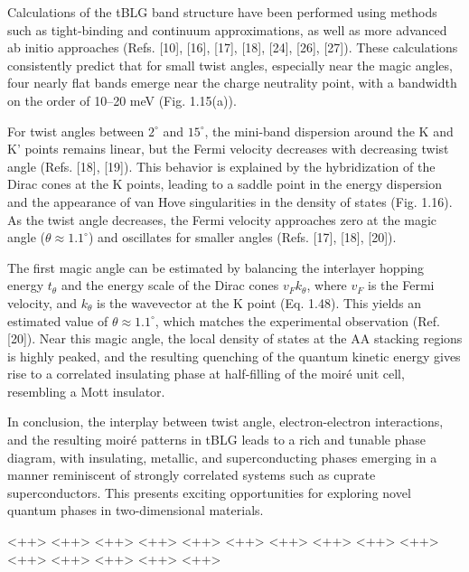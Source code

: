 Calculations of the tBLG band structure have been performed using methods such as tight-binding and continuum approximations, as well as more advanced ab initio approaches (Refs. [10], [16], [17], [18], [24], [26], [27]). These calculations consistently predict that for small twist angles, especially near the magic angles, four nearly flat bands emerge near the charge neutrality point, with a bandwidth on the order of 10–20 meV (Fig. 1.15(a)).

For twist angles between \(2^\circ\) and \(15^\circ\), the mini-band dispersion around the K and K' points remains linear, but the Fermi velocity decreases with decreasing twist angle (Refs. [18], [19]). This behavior is explained by the hybridization of the Dirac cones at the K points, leading to a saddle point in the energy dispersion and the appearance of van Hove singularities in the density of states (Fig. 1.16). As the twist angle decreases, the Fermi velocity approaches zero at the magic angle (\(\theta \approx 1.1^\circ\)) and oscillates for smaller angles (Refs. [17], [18], [20]).

The first magic angle can be estimated by balancing the interlayer hopping energy \(t_\theta\) and the energy scale of the Dirac cones \(v_F k_\theta\), where \(v_F\) is the Fermi velocity, and \(k_\theta\) is the wavevector at the K point (Eq. 1.48). This yields an estimated value of \(\theta \approx 1.1^\circ\), which matches the experimental observation (Ref. [20]). Near this magic angle, the local density of states at the AA stacking regions is highly peaked, and the resulting quenching of the quantum kinetic energy gives rise to a correlated insulating phase at half-filling of the moiré unit cell, resembling a Mott insulator.

In conclusion, the interplay between twist angle, electron-electron interactions, and the resulting moiré patterns in tBLG leads to a rich and tunable phase diagram, with insulating, metallic, and superconducting phases emerging in a manner reminiscent of strongly correlated systems such as cuprate superconductors. This presents exciting opportunities for exploring novel quantum phases in two-dimensional materials.

<++> <++> <++> <++> <++> <++> <++> <++> <++> <++> <++> <++> <++> <++> <++>




%




